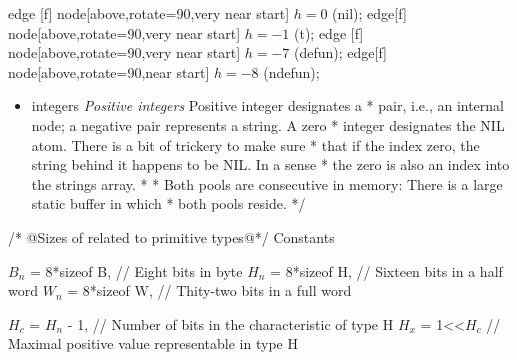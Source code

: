 \documentclass[12pt]{article}
\newenvironment{layout}{\quote\tikzpicture[start chain=going right,x=13pt,y=13pt]\scriptsize}
                       {\endtikzpicture\endquote}
\begin{document}
\begin{code}
\begin{description}
\begin{layout}
     edge [f] node[above,rotate=90,very near start] {\tiny $h=0$} (nil);
     edge[f] node[above,rotate=90,very near start] {\tiny $h=-1$} (t);
     edge [f] node[above,rotate=90,very near start] {\tiny $h=-7$} (defun);
     edge[f] node[above,rotate=90,near start] {\tiny $h=-8$} (ndefun);


\end{layout}
\end{description}
\end{code}



\begin{itemize}
    \item  integers 
    \emph{Positive integers}
Positive integer designates a * 
pair, i.e., an internal node; a negative pair represents a string. A zero
 * integer designates the NIL atom.  There is a bit of trickery to make sure
 * that if the index zero, the string behind it happens to be NIL. In a sense
 * the zero is also an index into the strings array.
 *
 * Both pools are consecutive in memory: There is a large static buffer in which 
 * both pools reside.
 */
\end{itemize}



\begin{code}[literate=
    {=}{$\equiv$ }{1}
    {*}{$\times$}{1}
    {1<<$H_c$}{$2^{H_c}$}{3}
]
/* @Sizes of related to primitive types@*/
Constants {
    $B_n$ = 8*sizeof B,    // Eight bits in byte
    $H_n$ = 8*sizeof H,    // Sixteen bits in a half word
    $W_n$ = 8*sizeof W,    // Thity-two bits in a full word
    
    $H_c$ = $H_n$ - 1,     // Number of bits in the characteristic of type H
    $H_x$ = 1<<$H_c$       // Maximal positive value representable in type H
}
\end{code}
\end{document}
